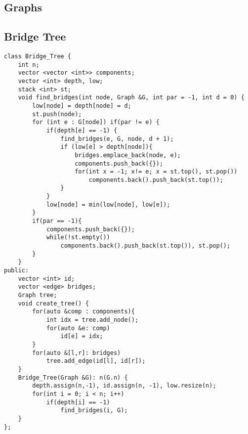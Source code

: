 \documentclass[FSZ,a4paper,onesided]{article}
\begin{document}
\begin{multicols*}{\COLS}
\section{Graphs}
\subsection{Bridge Tree}
\begin{lstlisting}
class Bridge_Tree {
    int n;
    vector <vector <int>> components;
    vector <int> depth, low;
    stack <int> st;
    void find_bridges(int node, Graph &G, int par = -1, int d = 0) {
        low[node] = depth[node] = d;
        st.push(node);
        for (int e : G[node]) if(par != e) {
            if(depth[e] == -1) {
                find_bridges(e, G, node, d + 1);
                if (low[e] > depth[node]){
                    bridges.emplace_back(node, e);
                    components.push_back({});
                    for(int x = -1; x!= e; x = st.top(), st.pop()) 
                        components.back().push_back(st.top());
                }
            }
            low[node] = min(low[node], low[e]);
        }
        if(par == -1){
            components.push_back({});
            while(!st.empty())
                components.back().push_back(st.top()), st.pop();
        }   
    }
public:
    vector <int> id;
    vector <edge> bridges;
    Graph tree;
    void create_tree() {
        for(auto &comp : components){
            int idx = tree.add_node();
            for(auto &e: comp)
                id[e] = idx;
        }
        for(auto &[l,r]: bridges)
            tree.add_edge(id[l], id[r]);
    }
    Bridge_Tree(Graph &G): n(G.n) {
        depth.assign(n,-1), id.assign(n, -1), low.resize(n);
        for(int i = 0; i < n; i++)
            if(depth[i] == -1)
                find_bridges(i, G);
    }
};
\end{lstlisting}

\end{multicols*}
\end{document}
